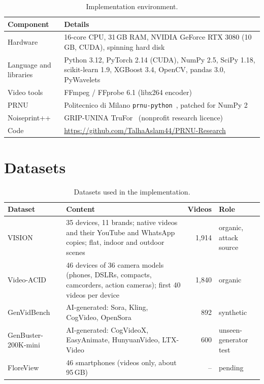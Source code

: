 \documentclass[11pt,a4paper]{article}
\begin{document}
\begin{table}[H]
\centering\small
\caption{Implementation environment.}
\begin{tabularx}{\linewidth}{lY}
\toprule
Component & Details \\
\midrule
Hardware & 16-core CPU, 31\,GB RAM, NVIDIA GeForce RTX 3080 (10\,GB, CUDA), spinning hard disk \\
Language and libraries & Python 3.12, PyTorch 2.14 (CUDA), NumPy 2.5, SciPy 1.18, scikit-learn 1.9,
  XGBoost 3.4, OpenCV, pandas 3.0, PyWavelets \\
Video tools & FFmpeg / FFprobe 6.1 (libx264 encoder) \\
PRNU & Politecnico di Milano \texttt{prnu-python}~\cite{prnupython}, patched for NumPy 2 \\
Noiseprint++ & GRIP-UNINA TruFor~\cite{trufor} (nonprofit research licence) \\
Code & \url{https://github.com/TalhaAslam44/PRNU-Research} \\
\bottomrule
\end{tabularx}
\end{table}

\section{Datasets}

\begin{table}[H]
\centering\small
\caption{Datasets used in the implementation.}
\label{tab:datasets}
\begin{tabularx}{\linewidth}{lYrl}
\toprule
Dataset & Content & Videos & Role \\
\midrule
VISION~\cite{vision} & 35 devices, 11 brands; native videos and their YouTube and WhatsApp copies;
  flat, indoor and outdoor scenes & 1{,}914 & organic, attack source \\
Video-ACID~\cite{acid} & 46 devices of 36 camera models (phones, DSLRs, compacts, camcorders,
  action cameras); first 40 videos per device & 1{,}840 & organic \\
GenVidBench~\cite{genvidbench} & AI-generated: Sora, Kling, CogVideo, OpenSora & 892 & synthetic \\
GenBuster-200K-mini~\cite{busterx} & AI-generated: CogVideoX, EasyAnimate, HunyuanVideo, LTX-Video & 600 &
  unseen-generator test \\
FloreView~\cite{floreview} & 46 smartphones (videos only, about 95\,GB) & -- & pending \\
\bottomrule
\end{tabularx}
\end{table}
\end{document}
